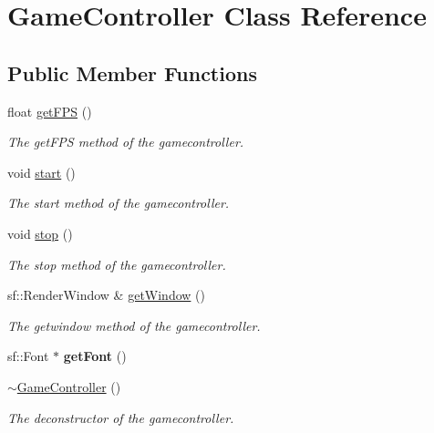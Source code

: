 \hypertarget{class_game_controller}{\section{Game\-Controller Class Reference}
\label{class_game_controller}
}
\subsection*{Public Member Functions}
\begin{DoxyCompactItemize}
\item 
float \hyperlink{class_game_controller_a54e8117f438fa872e5c1b24fd9469816}{get\-F\-P\-S} ()
\begin{DoxyCompactList}\small\item\em The get\-F\-P\-S method of the gamecontroller. \end{DoxyCompactList}\item 
void \hyperlink{class_game_controller_af365cd7a71dd76730a0bc92adc092103}{start} ()
\begin{DoxyCompactList}\small\item\em The start method of the gamecontroller. \end{DoxyCompactList}\item 
void \hyperlink{class_game_controller_a97872acdc39172c21e06665854656994}{stop} ()
\begin{DoxyCompactList}\small\item\em The stop method of the gamecontroller. \end{DoxyCompactList}\item 
sf\-::\-Render\-Window \& \hyperlink{class_game_controller_a993ad55478fff868c801ee7e6f4aaa2b}{get\-Window} ()
\begin{DoxyCompactList}\small\item\em The getwindow method of the gamecontroller. \end{DoxyCompactList}\item 
\hypertarget{class_game_controller_a305a4e04f9d2e6232a8a63fe1c6d317e}{sf\-::\-Font $\ast$ {\bfseries get\-Font} ()}\label{class_game_controller_a305a4e04f9d2e6232a8a63fe1c6d317e}

\item 
\hypertarget{class_game_controller_aab436961a422d078975bc7a49bdfcab7}{\hyperlink{class_game_controller_aab436961a422d078975bc7a49bdfcab7}{$\sim$\-Game\-Controller} ()}\label{class_game_controller_aab436961a422d078975bc7a49bdfcab7}

\begin{DoxyCompactList}\small\item\em The deconstructor of the gamecontroller. \end{DoxyCompactList}\end{DoxyCompactItemize}
